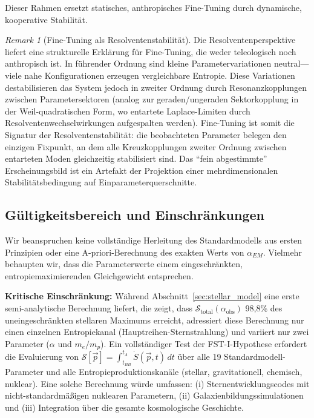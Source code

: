 \documentclass[12pt,a4paper]{article}
\theoremstyle{remark}
\newtheorem{remark}{Remark}
\begin{document}
Dieser Rahmen ersetzt statisches, anthropisches Fine-Tuning durch dynamische, kooperative Stabilit\"at.

\begin{remark}[Fine-Tuning als Resolventenstabilit\"at]
\label{rem:fine-tuning-resolvent}
Die Resolventenperspektive \citep{GeigerRH2026b} liefert eine strukturelle Erkl\"arung f\"ur Fine-Tuning, die weder teleologisch noch anthropisch ist. In f\"uhrender Ordnung sind kleine Parametervariationen neutral---viele nahe Konfigurationen erzeugen vergleichbare Entropie. Diese Variationen destabilisieren das System jedoch in zweiter Ordnung durch Resonanzkopplungen zwischen Parametersektoren (analog zur geraden/ungeraden Sektorkopplung in der Weil-quadratischen Form, wo entartete Laplace-Limiten durch Resolventenwechselwirkungen aufgespalten werden). Fine-Tuning ist somit die Signatur der Resolventenstabilit\"at: die beobachteten Parameter belegen den einzigen Fixpunkt, an dem alle Kreuzkopplungen zweiter Ordnung zwischen entarteten Moden gleichzeitig stabilisiert sind. Das ``fein abgestimmte'' Erscheinungsbild ist ein Artefakt der Projektion einer mehrdimensionalen Stabilit\"atsbedingung auf Einparameterquerschnitte.
\end{remark}

\subsection{G\"ultigkeitsbereich und Einschr\"ankungen}

Wir beanspruchen keine vollst\"andige Herleitung des Standardmodells aus ersten Prinzipien oder eine A-priori-Berechnung des exakten Werts von $\alpha_{EM}$. Vielmehr behaupten wir, dass die Parameterwerte einem eingeschr\"ankten, entropiemaximierenden Gleichgewicht entsprechen.

\textbf{Kritische Einschr\"ankung:} W\"ahrend Abschnitt~\ref{sec:stellar_model} eine erste semi-analytische Berechnung liefert, die zeigt, dass $\mathcal{S}_{\text{total}}(\alpha_{\text{obs}})$ 98,8\% des uneingeschr\"ankten stellaren Maximums erreicht, adressiert diese Berechnung nur einen einzelnen Entropiekanal (Hauptreihen-Sternstrahlung) und variiert nur zwei Parameter ($\alpha$ und $m_e/m_p$). Ein vollst\"andiger Test der FST-I-Hypothese erfordert die Evaluierung von $\mathcal{S}[\vec{p}] = \int_{t_{BB}}^{t_\Lambda} \dot{S}(\vec{p}, t)\,dt$ \"uber alle 19 Standardmodell-Parameter und alle Entropieproduktionskan\"ale (stellar, gravitationell, chemisch, nuklear). Eine solche Berechnung w\"urde umfassen: (i) Sternentwicklungscodes mit nicht-standardm\"a\ss{}igen nuklearen Parametern, (ii) Galaxienbildungssimulationen und (iii) Integration \"uber die gesamte kosmologische Geschichte.
\end{document}
